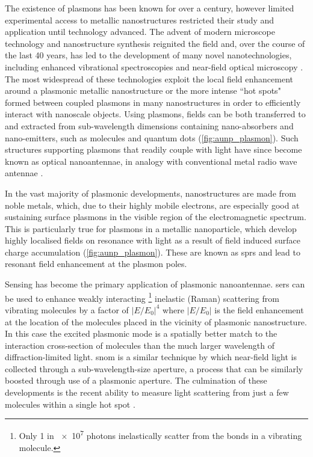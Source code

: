 \documentclass[12pt, a4paper, twoside]{book}
\begin{document}
The existence of plasmons has been known for over a century, however limited experimental access to metallic nanostructures restricted their study and application until technology advanced. The advent of modern microscope technology and nanostructure synthesis reignited the field and, over the course of the last 40 years, has led to the development of many novel nanotechnologies, including enhanced vibrational spectroscopies \cite{fleischmann1974, jeanmaire1977} and near-field optical microscopy \cite{ash1972super, pohl1984optical, lewis1984development, pohl1986optical, harootunian1986super, betzig1988near}. The most widespread of these technologies exploit the local field enhancement around a plasmonic metallic nanostructure or the more intense ``hot spots" formed between coupled plasmons in many nanostructures in order to efficiently interact with nanoscale objects. Using plasmons, fields can be both transferred to and extracted from sub-wavelength dimensions containing nano-absorbers and nano-emitters, such as molecules and quantum dots (\autoref{fig:aunp_plasmon}). Such structures supporting plasmons that readily couple with light have since become known as optical nanoantennae, in analogy with conventional metal radio wave antennae \cite{novotny2011}.

In the vast majority of plasmonic developments, nanostructures are made from noble metals, which, due to their highly mobile electrons, are especially good at sustaining surface plasmons in the visible region of the electromagnetic spectrum. This is particularly true for plasmons in a metallic nanoparticle, which develop highly localised fields on resonance with light as a result of field induced surface charge accumulation (\autoref{fig:aunp_plasmon}). These are known as \glspl{spr} and lead to resonant field enhancement at the plasmon poles.

Sensing has become the primary application of plasmonic nanoantennae. \Gls{sers} can be used to enhance weakly interacting%
\footnote{Only 1 in \num{e7} photons inelastically scatter from the bonds in a vibrating molecule.}
inelastic (Raman) scattering from vibrating molecules \cite{raman1928} by a factor of $|E/E_0|^4$ where $|E/E_0|$ is the field enhancement at the location of the molecules placed in the vicinity of plasmonic nanostructure. In this case the excited plasmonic mode is a spatially better match to the interaction cross-section of molecules than the much larger wavelength of diffraction-limited light. \Gls{snom} is a similar technique by which near-field light is collected through a sub-wavelength-size aperture, a process that can be similarly boosted through use of a plasmonic aperture. The culmination of these developments is the recent ability to measure light scattering from just a few molecules within a single hot spot \cite{zhang2013}.
\end{document}

